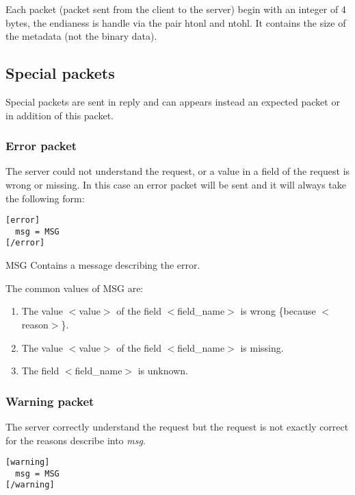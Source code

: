 Each packet (packet sent from the client to the server) begin with an integer of 4 bytes, the endianess is handle via the pair htonl and ntohl. It contains the size of the metadata (not the binary data).
\subsection{Special packets}
\label{wire:specialpackets}

Special packets are sent in reply and can appears instead an expected packet or in addition of this packet.

\subsubsection{Error packet}
\label{wire:specialpackets:errorpacket}

 The server could not understand the request, or a value in a field of the request is wrong or missing.
In this case an error packet will be sent and it will always take the following form:
\begin{lstlisting}
[error]
  msg = MSG
[/error]
\end{lstlisting}

\begin{description}
 \item MSG Contains a message describing the error.
\end{description}

The common values of MSG are:

\begin{enumerate}
 \item The value $<$value$>$ of the field $<$field\_name$>$ is wrong \{because $<$reason$>$\}.
 \item The value $<$value$>$ of the field $<$field\_name$>$ is missing.
 \item The field $<$field\_name$>$ is unknown.
\end{enumerate}

\subsubsection{Warning packet}
\label{wire:specialpackets:warningpacket}

The server correctly understand the request but the request is not exactly correct for the reasons describe into \textit{msg}.
\begin{lstlisting}
[warning]
  msg = MSG
[/warning]
\end{lstlisting}

